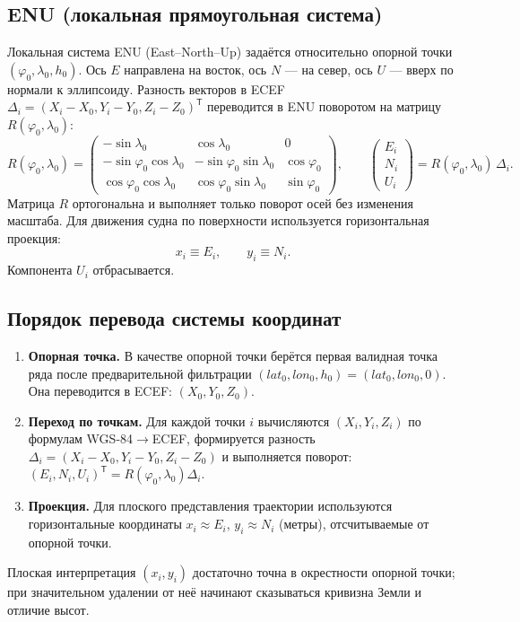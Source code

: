 \documentclass[a4paper,12pt]{report}
\begin{document}
	\subsection*{ENU (локальная прямоугольная система)}
	Локальная система ENU (East--North--Up) задаётся относительно опорной точки $(\varphi_0,\lambda_0,h_0)$. Ось $E$ направлена на восток, ось $N$ --- на север, ось $U$ --- вверх по нормали к эллипсоиду. Разность векторов в ECEF $\Delta_i = (X_i-X_0, Y_i-Y_0, Z_i-Z_0)^{\mathsf T}$ переводится в ENU поворотом на матрицу $R(\varphi_0,\lambda_0)$:
	\begin{equation*}
		R(\varphi_0,\lambda_0)=
		\begin{pmatrix}
			-\sin\lambda_0 & \cos\lambda_0 & 0\\
			-\sin\varphi_0\cos\lambda_0 & -\sin\varphi_0\sin\lambda_0 & \cos\varphi_0\\
			\cos\varphi_0\cos\lambda_0 & \cos\varphi_0\sin\lambda_0 & \sin\varphi_0
		\end{pmatrix}, \qquad
		\begin{pmatrix}E_i\\N_i\\U_i\end{pmatrix}=R(\varphi_0,\lambda_0)\,\Delta_i.
	\end{equation*}
	Матрица $R$ ортогональна и выполняет только поворот осей без изменения масштаба. Для движения судна по поверхности используется горизонтальная проекция:
	\begin{equation*}
		x_i \equiv E_i, \qquad y_i \equiv N_i.
	\end{equation*}
	Компонента $U_i$ отбрасывается.

	\subsection*{Порядок перевода системы координат}
	\begin{enumerate}
		\item \textbf{Опорная точка.} В качестве опорной точки берётся первая валидная точка ряда после предварительной фильтрации $(\mathit{lat}_0,\mathit{lon}_0,h_0)=(\mathit{lat}_0,\mathit{lon}_0,0)$. Она переводится в ECEF: $(X_0,Y_0,Z_0)$.
		\item \textbf{Переход по точкам.} Для каждой точки $i$ вычисляются $(X_i,Y_i,Z_i)$ по формулам WGS-84$\to$ECEF, формируется разность $\Delta_i=(X_i-X_0,Y_i-Y_0,Z_i-Z_0)$ и выполняется поворот: $(E_i,N_i,U_i)^{\mathsf T}=R(\varphi_0,\lambda_0)\Delta_i$.
		\item \textbf{Проекция.} Для плоского представления траектории используются горизонтальные координаты $x_i \approx E_i$, $y_i \approx N_i$ (метры), отсчитываемые от опорной точки.
	\end{enumerate}
	Плоская интерпретация $(x_i,y_i)$ достаточно точна в окрестности опорной точки; при значительном удалении от неё начинают сказываться кривизна Земли и отличие высот.
\end{document}
